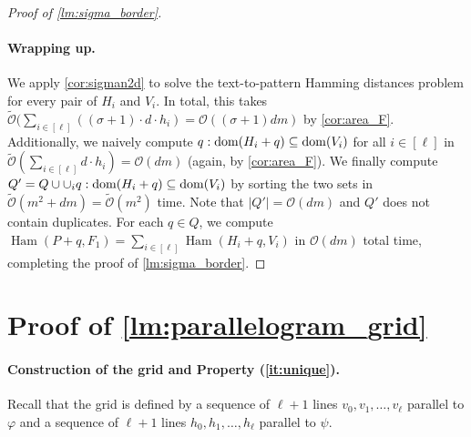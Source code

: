 \documentclass[11pt, letterpaper]{article}
\theoremstyle{plain}
\theoremstyle{definition}
\theoremstyle{remark}
\renewcommand{\O}{\mathcal{O}}
\newcommand{\tO}{\tilde{\mathcal{O}}}
\renewcommand{\phi}{\varphi}
\DeclareMathOperator*{\Ham}{Ham}
\begin{document}
\begin{proof}[{Proof of \cref{lm:sigma_border}}]
\paragraph*{Wrapping up.}
We apply \cref{cor:sigman2d} to solve the text-to-pattern Hamming distances problem for every pair of $H_i$ and $V_i$. In total, this takes $\tO(\sum_{i \in [\ell]} ((\sigma+1) \cdot d \cdot h_i) = \O((\sigma+1) dm)$ by \cref{cor:area_F}. Additionally, we naively compute ${q : \operatorname*{dom}(H_i+q) \subseteq \operatorname*{dom}(V_i)}$ for all $i \in [\ell]$ in $\tO(\sum_{i \in [\ell]} d \cdot h_i) = \O(dm)$ (again, by \cref{cor:area_F}). We finally compute $Q' = Q \cup \cup_i {q : \operatorname*{dom}(H_i+q) \subseteq \operatorname*{dom}(V_i)}$ by sorting the two sets in $\tO(m^2 + dm) = \tO(m^2)$ time. Note that $|Q'| = \O(dm)$ and $Q'$ does not contain duplicates. For each $q \in Q$, we compute $\Ham(P + q, F_1) = \sum_{i \in [\ell]} \Ham(H_i + q, V_i)$ in $\O(dm)$ total time, completing the proof of \cref{lm:sigma_border}.
\end{proof}





\appendix
\section{Proof of \cref{lm:parallelogram_grid}}
\label{app:parallelogram_grid}
\paragraph*{Construction of the grid and Property (\ref{it:unique}).}
Recall that the grid is defined by a sequence of $\ell+1$ lines $v_0, v_1, \ldots, v_\ell$ parallel to $\phi$ and a sequence of $\ell+1$ lines $h_0, h_1, \ldots, h_\ell$ parallel to $\psi$. 
\end{document}
